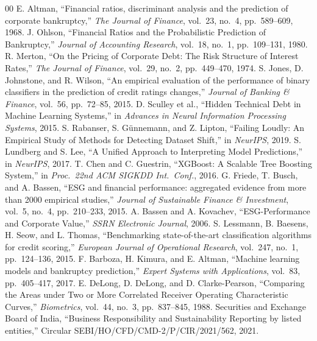 \documentclass[conference]{IEEEtran}
\begin{document}
\begin{thebibliography}{00}
 E. Altman, ``Financial ratios, discriminant analysis and the prediction of corporate bankruptcy,'' \textit{The Journal of Finance}, vol.~23, no.~4, pp.~589--609, 1968.
 J. Ohlson, ``Financial Ratios and the Probabilistic Prediction of Bankruptcy,'' \textit{Journal of Accounting Research}, vol.~18, no.~1, pp.~109--131, 1980.
 R. Merton, ``On the Pricing of Corporate Debt: The Risk Structure of Interest Rates,'' \textit{The Journal of Finance}, vol.~29, no.~2, pp.~449--470, 1974.
 S. Jones, D. Johnstone, and R. Wilson, ``An empirical evaluation of the performance of binary classifiers in the prediction of credit ratings changes,'' \textit{Journal of Banking \& Finance}, vol.~56, pp.~72--85, 2015.
 D. Sculley et al., ``Hidden Technical Debt in Machine Learning Systems,'' in \textit{Advances in Neural Information Processing Systems}, 2015.
 S. Rabanser, S. G\"{u}nnemann, and Z. Lipton, ``Failing Loudly: An Empirical Study of Methods for Detecting Dataset Shift,'' in \textit{NeurIPS}, 2019.
 S. Lundberg and S. Lee, ``A Unified Approach to Interpreting Model Predictions,'' in \textit{NeurIPS}, 2017.
 T. Chen and C. Guestrin, ``XGBoost: A Scalable Tree Boosting System,'' in \textit{Proc.\ 22nd ACM SIGKDD Int.\ Conf.}, 2016.
 G. Friede, T. Busch, and A. Bassen, ``ESG and financial performance: aggregated evidence from more than 2000 empirical studies,'' \textit{Journal of Sustainable Finance \& Investment}, vol.~5, no.~4, pp.~210--233, 2015.
 A. Bassen and A. Kovachev, ``ESG-Performance and Corporate Value,'' \textit{SSRN Electronic Journal}, 2006.
 S. Lessmann, B. Baesens, H. Seow, and L. Thomas, ``Benchmarking state-of-the-art classification algorithms for credit scoring,'' \textit{European Journal of Operational Research}, vol.~247, no.~1, pp.~124--136, 2015.
 F. Barboza, H. Kimura, and E. Altman, ``Machine learning models and bankruptcy prediction,'' \textit{Expert Systems with Applications}, vol.~83, pp.~405--417, 2017.
 E. DeLong, D. DeLong, and D. Clarke-Pearson, ``Comparing the Areas under Two or More Correlated Receiver Operating Characteristic Curves,'' \textit{Biometrics}, vol.~44, no.~3, pp.~837--845, 1988.
 Securities and Exchange Board of India, ``Business Responsibility and Sustainability Reporting by listed entities,'' Circular SEBI/HO/CFD/CMD-2/P/CIR/2021/562, 2021.
\end{thebibliography}
\end{document}
